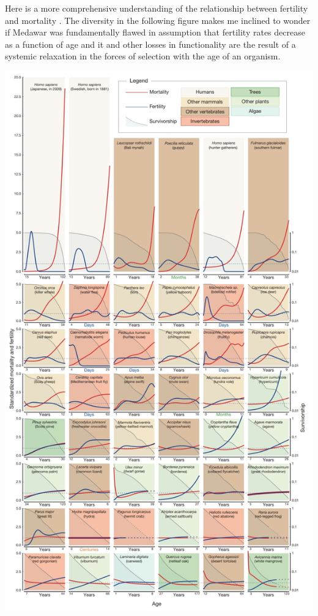 \documentclass[]{book}
\newenvironment{Shaded}{\begin{snugshade}}{\end{snugshade}}
\newcommand{\KeywordTok}[1]{\textcolor[rgb]{0.13,0.29,0.53}{\textbf{#1}}}
\newcommand{\DataTypeTok}[1]{\textcolor[rgb]{0.13,0.29,0.53}{#1}}
\newcommand{\DecValTok}[1]{\textcolor[rgb]{0.00,0.00,0.81}{#1}}
\newcommand{\StringTok}[1]{\textcolor[rgb]{0.31,0.60,0.02}{#1}}
\newcommand{\OtherTok}[1]{\textcolor[rgb]{0.56,0.35,0.01}{#1}}
\newcommand{\OperatorTok}[1]{\textcolor[rgb]{0.81,0.36,0.00}{\textbf{#1}}}
\newcommand{\NormalTok}[1]{#1}
\begin{document}
Here is a more comprehensive understanding of the relationship between
fertility and mortality \citep{jones2014diversity}. The diversity in the
following figure makes me inclined to wonder if Medawar was
fundamentally flawed in assumption that fertility rates decrease as a
function of age and it and other losses in functionality are the result
of a systemic relaxation in the forces of selection with the age of an
organism.

\begin{Shaded}
\end{Shaded}

\includegraphics{images/04-7.jpg}
\end{document}
